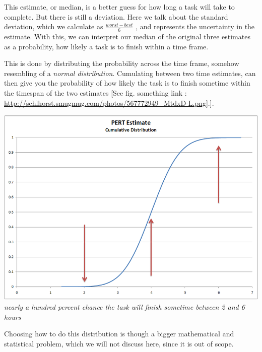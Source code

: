This estimate, or median, is a better guess for how long a task will take to complete. But there is still a deviation. Here we talk about the standard deviation, which we calculate as 
$\frac{worst-best}{6}$
, and represents the uncertainty in the estimate. With this, we can interpret our median of the original three estimates as a probability, how likely a task is to finish within a time frame. \

This is done by distributing the probability across the time frame, somehow resembling of a \textit{normal distribution}. Cumulating between two time estimates, can then give you the probability of how likely the task is to finish sometime within the timespan of the two estimates [See fig. something link : \url{http://sehlhorst.smugmug.com/photos/567772949_MtdxD-L.png}].]. \

\begin{center}
\includegraphics[scale=0.5]{PERTDistribution.png} 
\textit{nearly a hundred percent chance the task will finish sometime between 2 and 6 hours}

\end{center}

Choosing how to do this distribution is though a bigger mathematical and statistical problem, which we will not discuss here, since it is out of scope.

